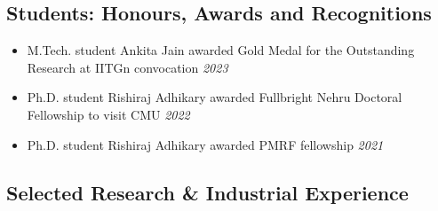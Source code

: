 \documentclass[letter,10pt]{article}
\begin{document}
\subsection*{\sc \textbf{Students: Honours, Awards and Recognitions}\hspace{5pt}\noindent\hrulefill}
\begin{itemize}
\item[]{M.Tech. student Ankita Jain awarded Gold Medal for the Outstanding Research at IITGn convocation} \hfill\textit{2023}
\item[]{Ph.D. student Rishiraj Adhikary awarded Fullbright Nehru Doctoral Fellowship to visit CMU} \hfill\textit{2022}
\item[]{Ph.D. student Rishiraj Adhikary awarded PMRF fellowship} \hfill\textit{2021}
   
    
\end{itemize}


\subsection*{\sc \textbf{Selected Research \& Industrial Experience}\hspace{5pt}\noindent\hrulefill}
\end{document}
